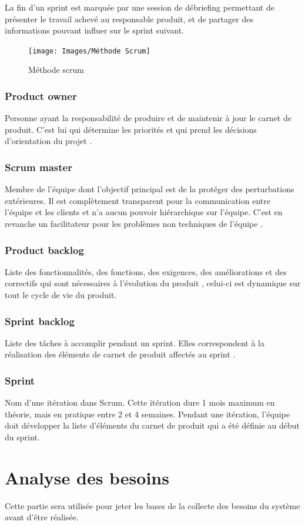 	
	La fin d’un sprint est marquée par une session de débriefing permettant de présenter le travail achevé au responsable produit, et de partager des informations pouvant influer sur le sprint suivant.
		\begin{figure} [h]
		\begin{center}
			\centering
			\texttt{[image: Images/Méthode Scrum]}
		\end{center}
		\caption{Méthode scrum}
	\end{figure}
	
	\subsubsection{Product owner }
	Personne ayant la responsabilité de produire et de maintenir à jour le carnet de produit. C'est lui qui détermine les priorités et qui prend les décisions d'orientation du projet .
	\subsubsection{Scrum master  }
	Membre de l'équipe dont l'objectif principal est de la protéger des perturbations extérieures. Il est complètement transparent pour la communication entre l'équipe et les clients et n'a aucun pouvoir hiérarchique sur l'équipe. C'est en revanche un facilitateur pour les problèmes non techniques de l'équipe .
	\subsubsection{Product backlog  }
	Liste des fonctionnalités, des fonctions, des exigences, des améliorations et des correctifs qui sont nécessaires à l'évolution du produit , celui-ci est dynamique sur tout le cycle de vie du produit.
	\subsubsection{	Sprint backlog }
	Liste des tâches à accomplir pendant un sprint. Elles correspondent à la réalisation des éléments de carnet de produit affectés au sprint .
	\subsubsection{Sprint }
	Nom d'une itération dans Scrum. Cette itération dure 1 mois maximum en théorie, mais en pratique entre 2 et 4 semaines. Pendant une itération, l'équipe doit développer la liste d'éléments du carnet de produit qui a été définie au début du sprint.
	\section{Analyse des besoins }	
	Cette partie sera utilisée pour jeter les bases de la collecte des besoins du système avant d'être réalisée.
	
